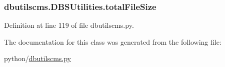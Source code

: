 \subsubsection[{total\-File\-Size}]{\setlength{\rightskip}{0pt plus 5cm}dbutilscms.\-D\-B\-S\-Utilities.\-total\-File\-Size}\label{classdbutilscms_1_1DBSUtilities_a14665ed3caa9f768da3e01791dbf5a05}


Definition at line 119 of file dbutilscms.\-py.



The documentation for this class was generated from the following file\-:\begin{DoxyCompactItemize}
\item 
python/\hyperlink{dbutilscms_8py}{dbutilscms.\-py}\end{DoxyCompactItemize}
